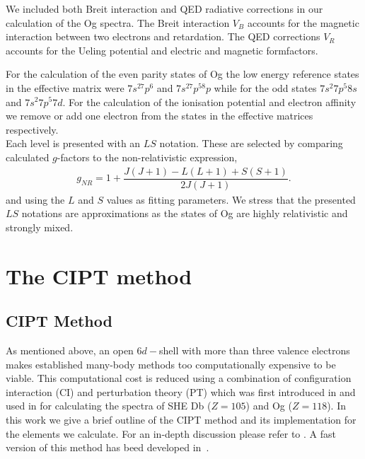 \documentclass[10pt,a4paper, twoside]{report}
\begin{document}
We included both Breit interaction\cite{Breit1929, Mann1971, DF2016}  and QED radiative corrections in our calculation of the Og spectra.  The Breit interaction $V_B$ accounts for the magnetic interaction between two electrons and retardation. The QED corrections $V_R$ accounts for the Ueling potential and electric and magnetic formfactors\cite{FG2005}. 

For the calculation of the even parity states of Og the low energy reference states in the effective matrix were $7s^27p^6$ and $7s^27p^58p$ while for the odd states $7s^2 7p^5 8s$ and $7s^2 7p^5 7d$. For the calculation of the ionisation potential and electron affinity we remove or add one electron from the states in the effective matrices respectively.\\
 
Each level is presented with an $LS$ notation. These are selected by comparing calculated $g$-factors to the non-relativistic expression,
\begin{align} 
g_{NR} =  1 + \dfrac{J(J + 1) - L(L+1) + S(S+1)}{2J(J+1)}.
\end{align}
and using the $L$ and $S$ values as fitting parameters. We stress that the presented $LS$ notations are approximations as the states of Og are highly relativistic and strongly mixed. \\

\chapter{The CIPT method} \label{chap:CIPT}

\section{CIPT Method} \label{sec:CIPT}

As mentioned above, an open $6d-$shell with more than three  valence electrons makes established many-body methods too computationally expensive to be viable. This computational cost is reduced using a combination of configuration interaction (CI) and perturbation theory (PT) which was first introduced in \cite{DBHF2017} and used in \cite{LDFDb2018, LDF118} for calculating the spectra of SHE Db ($Z=105$) and Og ($Z=118$). In this work we give a brief outline of the CIPT method and its implementation for the elements we calculate. For an in-depth discussion please refer to \cite{DBHF2017}. A fast version of this method has beed developed in~\cite{FCI}.
\end{document}
